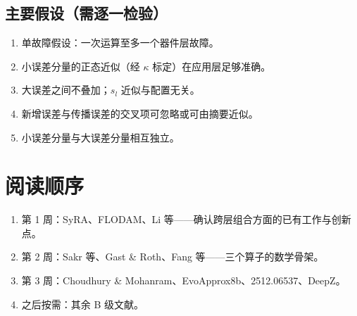 \documentclass[11pt,a4paper]{ctexart}
\begin{document}
\subsection{主要假设（需逐一检验）}
\begin{enumerate}[leftmargin=*]
  \item 单故障假设：一次运算至多一个器件层故障。
  \item 小误差分量的正态近似（经 $\kappa$ 标定）在应用层足够准确。
  \item 大误差之间不叠加；$s_l$ 近似与配置无关。
  \item 新增误差与传播误差的交叉项可忽略或可由摘要近似。
  \item 小误差分量与大误差分量相互独立。
\end{enumerate}

\section{阅读顺序}
\begin{enumerate}[leftmargin=*]
  \item 第 1 周：SyRA、FLODAM、Li 等——确认跨层组合方面的已有工作与创新点。
  \item 第 2 周：Sakr 等、Gast \& Roth、Fang 等——三个算子的数学骨架。
  \item 第 3 周：Choudhury \& Mohanram、EvoApprox8b、2512.06537、DeepZ。
  \item 之后按需：其余 B 级文献。
\end{enumerate}
\end{document}
